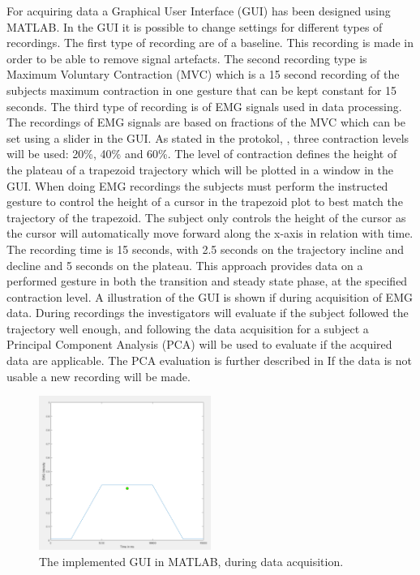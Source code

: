 For acquiring data a Graphical User Interface (GUI) has been designed using MATLAB. In the GUI it is possible to change settings for different types of recordings. The first type of recording are of a baseline. This recording is made in order to be able to remove signal artefacts. The second recording type is Maximum Voluntary Contraction (MVC) which is a 15 second recording of the subjects maximum contraction in one gesture that can be kept constant for 15 seconds. The third type of recording is of EMG signals used in data processing. The recordings of EMG signals are based on fractions of the MVC which can be set using a slider in the GUI. As stated in the protokol, , three contraction levels will be used: 20\%, 40\% and 60\%. The level of contraction defines the height of the plateau of a trapezoid trajectory which will be plotted in a window in the GUI. When doing EMG recordings the subjects must perform the instructed gesture to control the height of a cursor in the trapezoid plot to best match the trajectory of the trapezoid. The subject only controls the height of the cursor as the cursor will automatically move forward along the x-axis in relation with time. The recording time is 15 seconds, with 2.5 seconds on the trajectory incline and decline and 5 seconds on the plateau. This approach provides data on a performed gesture in both the transition and steady state phase, at the specified contraction level. A illustration of the GUI is shown if  during acquisition of EMG data. 
During recordings the investigators will evaluate if the subject followed the trajectory well enough, and following the data acquisition for a subject a Principal Component Analysis (PCA) will be used to evaluate if the acquired data are applicable. The PCA evaluation is further described in  If the data is not usable a new recording will be made. 

\begin{figure}[H] 
	\includegraphics[width=0.5\textwidth]{figures/xBackground/dataacqGUI}
	\caption{The implemented GUI in MATLAB, during data acquisition.}
	\label{fig:GUIplot}
\end{figure}
